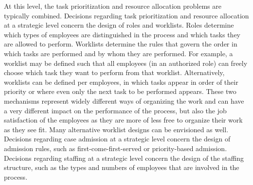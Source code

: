 \documentclass[runningheads]{llncs}
\begin{document}
At this level, the task prioritization and resource allocation problems are typically combined. Decisions regarding task prioritization and resource allocation at a strategic level concern the design of roles and worklists. Roles determine which types of employees are distinguished in the process and which tasks they are allowed to perform. Worklists determine the rules that govern the order in which tasks are performed and by whom they are performed. For example, a worklist may be defined such that all employees (in an authorized role) can freely choose which task they want to perform from that worklist. Alternatively, worklists can be defined per employees, in which tasks appear in order of their priority or where even only the next task to be performed appears. These two mechanisms represent widely different ways of organizing the work and can have a very different impact on the performance of the process, but also the job satisfaction of the employees as they are more of less free to organize their work as they see fit. Many alternative worklist designs can be envisioned as well. Decisions regarding case admission at a strategic level concern the design of admission rules, such as first-come-first-served or priority-based admission. Decisions regarding staffing at a strategic level concern the design of the staffing structure, such as the types and numbers of employees that are involved in the process.
\end{document}

